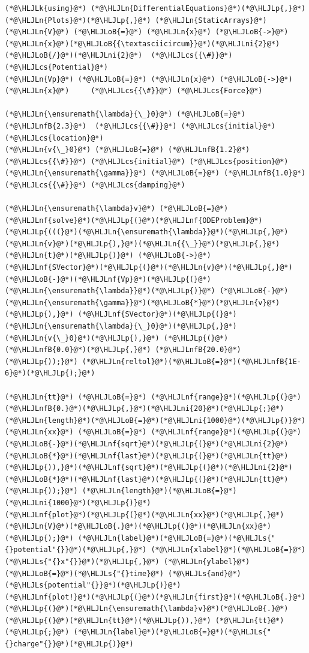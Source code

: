 \documentclass[12pt,a4paper]{article}
\newcommand{\HLJLk}[1]{\textcolor[RGB]{148,91,176}{\textbf{#1}}}
\newcommand{\HLJLn}[1]{#1}
\newcommand{\HLJLnf}[1]{\textcolor[RGB]{66,102,213}{#1}}
\newcommand{\HLJLs}[1]{\textcolor[RGB]{201,61,57}{#1}}
\newcommand{\HLJLnfB}[1]{\textcolor[RGB]{59,151,46}{#1}}
\newcommand{\HLJLni}[1]{\textcolor[RGB]{59,151,46}{#1}}
\newcommand{\HLJLoB}[1]{\textcolor[RGB]{102,102,102}{\textbf{#1}}}
\newcommand{\HLJLp}[1]{#1}
\newcommand{\HLJLcs}[1]{\textcolor[RGB]{153,153,119}{\textit{#1}}}
\begin{document}
\begin{lstlisting}
(*@\HLJLk{using}@*) (*@\HLJLn{DifferentialEquations}@*)(*@\HLJLp{,}@*) (*@\HLJLn{Plots}@*)(*@\HLJLp{,}@*) (*@\HLJLn{StaticArrays}@*)
(*@\HLJLn{V}@*) (*@\HLJLoB{=}@*) (*@\HLJLn{x}@*) (*@\HLJLoB{->}@*) (*@\HLJLn{x}@*)(*@\HLJLoB{{\textasciicircum}}@*)(*@\HLJLni{2}@*)(*@\HLJLoB{/}@*)(*@\HLJLni{2}@*)  (*@\HLJLcs{{\#}}@*) (*@\HLJLcs{Potential}@*)
(*@\HLJLn{Vp}@*) (*@\HLJLoB{=}@*) (*@\HLJLn{x}@*) (*@\HLJLoB{->}@*) (*@\HLJLn{x}@*)     (*@\HLJLcs{{\#}}@*) (*@\HLJLcs{Force}@*)

(*@\HLJLn{\ensuremath{\lambda}{\_}0}@*) (*@\HLJLoB{=}@*) (*@\HLJLnfB{2.3}@*)  (*@\HLJLcs{{\#}}@*) (*@\HLJLcs{initial}@*) (*@\HLJLcs{location}@*)
(*@\HLJLn{v{\_}0}@*) (*@\HLJLoB{=}@*) (*@\HLJLnfB{1.2}@*)  (*@\HLJLcs{{\#}}@*) (*@\HLJLcs{initial}@*) (*@\HLJLcs{position}@*)
(*@\HLJLn{\ensuremath{\gamma}}@*) (*@\HLJLoB{=}@*) (*@\HLJLnfB{1.0}@*)    (*@\HLJLcs{{\#}}@*) (*@\HLJLcs{damping}@*)

(*@\HLJLn{\ensuremath{\lambda}v}@*) (*@\HLJLoB{=}@*) (*@\HLJLnf{solve}@*)(*@\HLJLp{(}@*)(*@\HLJLnf{ODEProblem}@*)(*@\HLJLp{(((}@*)(*@\HLJLn{\ensuremath{\lambda}}@*)(*@\HLJLp{,}@*)(*@\HLJLn{v}@*)(*@\HLJLp{),}@*)(*@\HLJLn{{\_}}@*)(*@\HLJLp{,}@*)(*@\HLJLn{t}@*)(*@\HLJLp{)}@*) (*@\HLJLoB{->}@*) (*@\HLJLnf{SVector}@*)(*@\HLJLp{(}@*)(*@\HLJLn{v}@*)(*@\HLJLp{,}@*)(*@\HLJLoB{-}@*)(*@\HLJLnf{Vp}@*)(*@\HLJLp{(}@*)(*@\HLJLn{\ensuremath{\lambda}}@*)(*@\HLJLp{)}@*) (*@\HLJLoB{-}@*) (*@\HLJLn{\ensuremath{\gamma}}@*)(*@\HLJLoB{*}@*)(*@\HLJLn{v}@*)(*@\HLJLp{),}@*) (*@\HLJLnf{SVector}@*)(*@\HLJLp{(}@*)(*@\HLJLn{\ensuremath{\lambda}{\_}0}@*)(*@\HLJLp{,}@*)(*@\HLJLn{v{\_}0}@*)(*@\HLJLp{),}@*) (*@\HLJLp{(}@*)(*@\HLJLnfB{0.0}@*)(*@\HLJLp{,}@*) (*@\HLJLnfB{20.0}@*)(*@\HLJLp{));}@*) (*@\HLJLn{reltol}@*)(*@\HLJLoB{=}@*)(*@\HLJLnfB{1E-6}@*)(*@\HLJLp{);}@*)

(*@\HLJLn{tt}@*) (*@\HLJLoB{=}@*) (*@\HLJLnf{range}@*)(*@\HLJLp{(}@*)(*@\HLJLnfB{0.}@*)(*@\HLJLp{,}@*)(*@\HLJLni{20}@*)(*@\HLJLp{;}@*) (*@\HLJLn{length}@*)(*@\HLJLoB{=}@*)(*@\HLJLni{1000}@*)(*@\HLJLp{)}@*)
(*@\HLJLn{xx}@*) (*@\HLJLoB{=}@*) (*@\HLJLnf{range}@*)(*@\HLJLp{(}@*)(*@\HLJLoB{-}@*)(*@\HLJLnf{sqrt}@*)(*@\HLJLp{(}@*)(*@\HLJLni{2}@*)(*@\HLJLoB{*}@*)(*@\HLJLnf{last}@*)(*@\HLJLp{(}@*)(*@\HLJLn{tt}@*)(*@\HLJLp{)),}@*)(*@\HLJLnf{sqrt}@*)(*@\HLJLp{(}@*)(*@\HLJLni{2}@*)(*@\HLJLoB{*}@*)(*@\HLJLnf{last}@*)(*@\HLJLp{(}@*)(*@\HLJLn{tt}@*)(*@\HLJLp{));}@*) (*@\HLJLn{length}@*)(*@\HLJLoB{=}@*)(*@\HLJLni{1000}@*)(*@\HLJLp{)}@*)
(*@\HLJLnf{plot}@*)(*@\HLJLp{(}@*)(*@\HLJLn{xx}@*)(*@\HLJLp{,}@*) (*@\HLJLn{V}@*)(*@\HLJLoB{.}@*)(*@\HLJLp{(}@*)(*@\HLJLn{xx}@*)(*@\HLJLp{);}@*) (*@\HLJLn{label}@*)(*@\HLJLoB{=}@*)(*@\HLJLs{"{}potential"{}}@*)(*@\HLJLp{,}@*) (*@\HLJLn{xlabel}@*)(*@\HLJLoB{=}@*)(*@\HLJLs{"{}x"{}}@*)(*@\HLJLp{,}@*) (*@\HLJLn{ylabel}@*)(*@\HLJLoB{=}@*)(*@\HLJLs{"{}time}@*) (*@\HLJLs{and}@*) (*@\HLJLs{potential"{}}@*)(*@\HLJLp{)}@*)
(*@\HLJLnf{plot!}@*)(*@\HLJLp{(}@*)(*@\HLJLn{first}@*)(*@\HLJLoB{.}@*)(*@\HLJLp{(}@*)(*@\HLJLn{\ensuremath{\lambda}v}@*)(*@\HLJLoB{.}@*)(*@\HLJLp{(}@*)(*@\HLJLn{tt}@*)(*@\HLJLp{)),}@*) (*@\HLJLn{tt}@*)(*@\HLJLp{;}@*) (*@\HLJLn{label}@*)(*@\HLJLoB{=}@*)(*@\HLJLs{"{}charge"{}}@*)(*@\HLJLp{)}@*)
\end{lstlisting}
\end{document}
